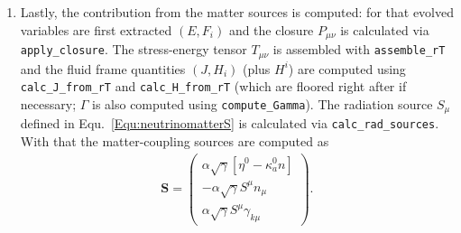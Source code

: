 \documentclass{article}
\newcommand{\var}[1]{%
  {\setlength{\fboxsep}{1.5pt}%
   \colorbox{varbg}{\textcolor{varfg}{\texttt{\small #1}}}}}
\begin{document}
\begin{enumerate}
\begin{align}
\begin{array}{c}
      \sqrt{\gamma}E\\
      \sqrt{\gamma}F_k
    \end{array}\right),\\
    \mathbf{F}&=\left(\begin{array}{c}
      \alpha\sqrt{\gamma}nf^i\\
      \sqrt{\gamma}[\alpha F^i-\beta^iE]\\
      \sqrt{\gamma}[\alpha P^i_k-\beta^iF_k]
    \end{array}\right).
  \end{align}
  For the latter we extract the evolved M1 variables
  $(E,F_i)$, apply the closure with \var{apply\_closure} to get $P_{\mu\nu}$, get the spatial components of both the radiation flux and the radiation pressure tensor and then computed the geometric sources according to
  Equ.~\eqref{Equ:Eevo} for $E$ and Equ.~\eqref{Equ:Fevo} for $F_i$ (also see~\cite{Radice:2021jtw} for the full form of the sources). In full generality:
  \begin{align}
    \mathbf{G}&=\left(\begin{array}{c}
      0\\
      \alpha\sqrt{\gamma}[P^{ik}K_{ik}-F^i\partial_i\log{\alpha}]\\
      \sqrt{\gamma}[F_i\partial_k\beta^i-E\partial_k\alpha+\frac{\alpha}{2}P^{ij}\partial_k\gamma_{ji}]
    \end{array}\right).
  \end{align}
  \item Lastly, the contribution from the matter sources is computed: for that evolved variables are first extracted $(E,F_i)$ and the closure $P_{\mu\nu}$ is calculated via
  \var{apply\_closure}. The stress-energy tensor $T_{\mu\nu}$ is assembled with \var{assemble\_rT} and the fluid frame quantities $(J,H_i)$ (plus $H^i$) are computed using
  \var{calc\_J\_from\_rT} and \var{calc\_H\_from\_rT} (which are floored right after if necessary; $\Gamma$ is also computed using \var{compute\_Gamma}).
  The radiation source $S_{\mu}$ defined in Equ.~\eqref{Equ:neutrinomatterS} is calculated via \var{calc\_rad\_sources}. With that the matter-coupling sources are computed as
  \begin{align}
    \mathbf{S}=\left(\begin{array}{c}
      \alpha\sqrt{\gamma}[\eta^0-\kappa_a^0n]\\
      -\alpha\sqrt{\gamma}S^{\mu}n_{\mu}\\
      \alpha\sqrt{\gamma}S^{\mu}\gamma_{k\mu}
    \end{array}\right).

\end{align}
\end{enumerate}
\end{document}
